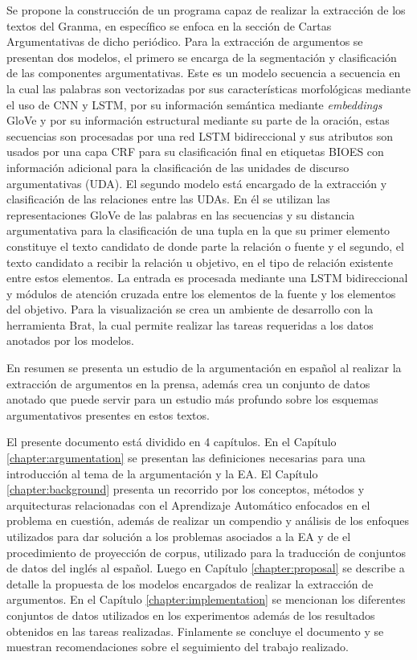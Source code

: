 Se propone la construcción de un programa capaz de realizar la extracción de los textos del Granma, 
en específico se enfoca en la sección de Cartas Argumentativas de dicho periódico. Para la extracción
de argumentos se presentan dos modelos, el primero se encarga de la segmentación y clasificación
de las componentes argumentativas. Este es un modelo secuencia a secuencia en la cual las palabras 
son vectorizadas por sus características morfológicas mediante el uso de CNN y LSTM, por su información
semántica mediante \emph{embeddings} GloVe y por su información estructural mediante su parte de la oración, estas 
secuencias son procesadas por una red LSTM bidireccional y sus atributos son usados por una capa CRF 
para su clasificación final en etiquetas BIOES con información adicional para la clasificación de las 
unidades de discurso argumentativas (UDA). El segundo modelo está encargado de la extracción y clasificación 
de las relaciones entre las UDAs. En él se utilizan las representaciones GloVe de las palabras en las secuencias 
y su distancia argumentativa para la clasificación de una tupla en la que su primer elemento 
constituye el texto candidato de donde parte la relación o fuente y el segundo, el texto candidato a recibir la 
relación u objetivo, en el tipo de relación existente entre estos elementos. La entrada es procesada mediante 
una LSTM bidireccional y módulos de atención cruzada entre los elementos de la fuente y los elementos del objetivo.
Para la visualización se crea un ambiente de desarrollo con la herramienta Brat, la cual permite realizar las 
tareas requeridas a los datos anotados por los modelos.

En resumen se presenta un estudio de la argumentación en español al realizar la extracción de 
argumentos en la prensa, además crea un conjunto de datos anotado que puede servir
para un estudio más profundo sobre los esquemas argumentativos presentes en estos textos. 


El presente documento está dividido en 4 capítulos.
En el Capítulo \ref{chapter:argumentation} se presentan las definiciones necesarias para una introducción
al tema de la argumentación y la EA.
El Capítulo \ref{chapter:background} presenta un recorrido por los 
conceptos, métodos y arquitecturas relacionadas con el Aprendizaje Automático enfocados en el problema 
en cuestión, además de realizar un compendio y análisis de los enfoques utilizados para dar solución
a los problemas asociados a la EA y de el procedimiento de proyección de corpus, utilizado para la 
traducción de conjuntos de datos del inglés al español. 
Luego en Capítulo \ref{chapter:proposal}
se describe a detalle la propuesta de los modelos encargados de realizar la extracción de argumentos.
En el Capítulo \ref{chapter:implementation} se mencionan los diferentes conjuntos de datos utilizados 
en los experimentos además de los resultados obtenidos en las tareas realizadas.
Finlamente se concluye el documento y se muestran recomendaciones sobre el seguimiento del trabajo 
realizado.
